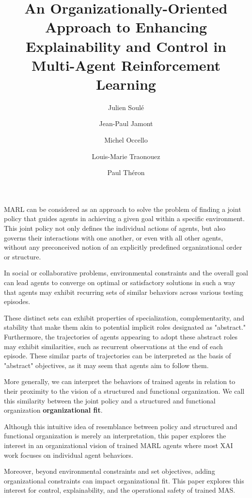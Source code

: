 \documentclass[sigconf,anonymous]{aamas}
\title[AAMAS-2025 CybMASDE]{An Organizationally-Oriented Approach to Enhancing Explainability and Control in Multi-Agent Reinforcement Learning}
\author{Julien Soulé}
\affiliation{
  \institution{Univ. Grenoble Alpes}
  \city{Valence}
  \country{France}}
\author{Jean-Paul Jamont}
\affiliation{
  \institution{Univ. Grenoble Alpes}
  \city{Valence}
  \country{France}}
\author{Michel Occello}
\affiliation{
  \institution{Univ. Grenoble Alpes}
  \city{Valence}
  \country{France}}
\author{Louis-Marie Traonouez}
\affiliation{
  \institution{Thales Land and Air Systems, BU IAS}
  \city{Rennes}
  \country{France}}
\author{Paul Théron}
\affiliation{
  \institution{AICA IWG}
  \city{La Guillermie}
  \country{France}}
\begin{document}

\pagestyle{fancy}
\fancyhead{}


\maketitle


MARL can be considered as an approach to solve the problem of finding a joint policy that guides agents in achieving a given goal within a specific environment. 
This joint policy not only defines the individual actions of agents, but also governs their interactions with one another, or even with all other agents, without any preconceived notion of an explicitly predefined organizational order or structure. 

In social or collaborative problems, environmental constraints and the overall goal can lead agents to converge on optimal or satisfactory solutions in such a way that agents may exhibit recurring sets of similar behaviors across various testing episodes. 

These distinct sets can exhibit properties of specialization, complementarity, and stability that make them akin to potential implicit roles designated as "abstract." Furthermore, the trajectories of agents appearing to adopt these abstract roles may exhibit similarities, such as recurrent observations at the end of each episode. These similar parts of trajectories can be interpreted as the basis of "abstract" objectives, as it may seem that agents aim to follow them. 

More generally, we can interpret the behaviors of trained agents in relation to their proximity to the vision of a structured and functional organization. We call this similarity between the joint policy and a structured and functional organization \textbf{organizational fit}. 

Although this intuitive idea of resemblance between policy and structured and functional organization is merely an interpretation, this paper explores the interest in an organizational vision of trained MARL agents where most XAI work focuses on individual agent behaviors. 

Moreover, beyond environmental constraints and set objectives, adding organizational constraints can impact organizational fit. This paper explores this interest for control, explainability, and the operational safety of trained MAS. 
\end{document}
